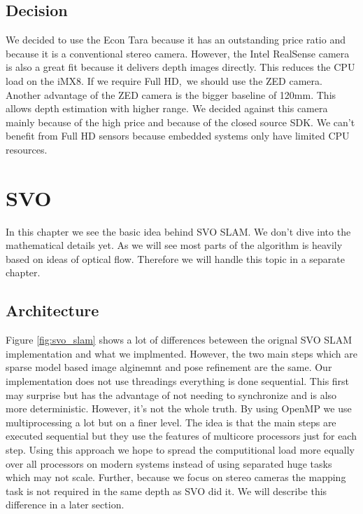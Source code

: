 \documentclass[11pt,a4paper,titlepage,oneside]{report}
\begin{document}
\section{Decision}

We decided to use the Econ Tara because it has an outstanding price ratio and because it is a conventional stereo camera. However, the Intel RealSense camera is also a great fit because it delivers depth images directly. This reduces the CPU load on the iMX8. If we require Full HD, we should use the ZED camera. Another advantage of the ZED camera is the bigger baseline of 120mm. This allows depth estimation with higher range. We decided against this camera mainly because of the high price and because of the closed source SDK. We can't benefit from Full HD sensors because embedded systems only have limited CPU resources.

\chapter{SVO}
In this chapter we see the basic idea behind SVO SLAM. We don't dive into the mathematical details yet. As we will see most parts of the algorithm is heavily based on ideas of optical flow. Therefore we will handle this topic in a separate chapter.

\section{Architecture}

Figure \ref{fig:svo_slam} shows a lot of differences beteween the orignal SVO SLAM implementation and what we implmented. However, the two main steps which are sparse model based image alginemnt and pose refinement are the same. Our implementation does not use threadings everything is done sequential. This first may surprise but has the advantage of not needing to synchronize and is also more deterministic. However, it's not the whole truth. By using OpenMP we use multiprocessing a lot but on a finer level. The idea is that the main steps are executed sequential but they use the features of multicore processors just for each step. Using this approach we hope to spread the computitional load more equally over all processors on modern systems instead of using separated huge tasks which may not scale. Further, because we focus on stereo cameras the mapping task is not required in the same depth as SVO did it. We will describe this difference in a later section.
\end{document}
